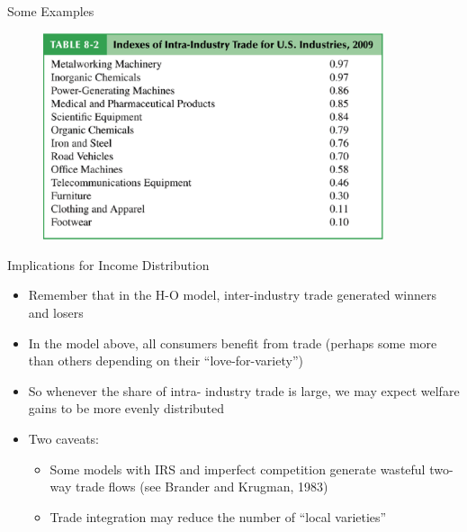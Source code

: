 \documentclass[10pt,hyperref={CJKbookmarks=true},xcolor=dvipsnames,aspectratio=169]{beamer}
\begin{document}
\begin{frame}{Some Examples }


\begin{figure}
\centering{}\includegraphics[width=10cm]{fig/krugman/lec6-20}
\end{figure}

\end{frame}

\begin{frame}{Implications for Income Distribution }

\begin{itemize}
\item Remember that in the H-O model, inter-industry trade generated winners
and losers 
\item In the model above, all consumers benefit from trade (perhaps some
more than others depending on their “love-for-variety”) 
\item So whenever the share of intra- industry trade is large, we may expect
welfare gains to be more evenly distributed
\item Two caveats: 

\begin{itemize}
\item Some models with IRS and imperfect competition generate wasteful two-way
trade flows (see Brander and Krugman, 1983) 
\item Trade integration may reduce the number of “local varieties” 
\end{itemize}
\end{itemize}
\end{frame}
\end{document}
